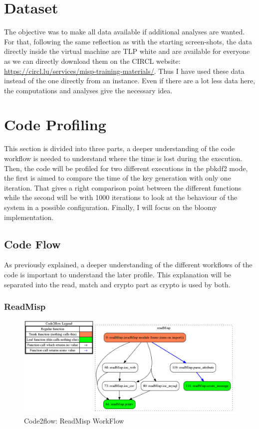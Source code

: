 \documentclass{eplmastersthesis}
\begin{document}
\section{Dataset}
The objective was to make all data available if additional analyses are wanted. For that, following the same reflection as with the starting screen-shots, the data directly inside the virtual machine are TLP white and are available for everyone as we can directly download them on the CIRCL website: \url{https://circl.lu/services/misp-training-materials/}.
Thus I have used these data instead of the one directly from an instance. Even if there are a lot less data here, the computations and analyses give the necessary idea.

\section{Code Profiling}
This section is divided into three parts, a deeper understanding of the code workflow is needed to understand where the time is lost during the execution. Then, the code will be profiled for two different executions in the \gls{pbkdf2} mode, the first is aimed to compare the time of the key generation with only one iteration. That gives a right comparison point between the different functions while the second will be with 1000 iterations to look at the behaviour of the system in a possible configuration. 
Finally, I will focus on the bloomy implementation.

\subsection{Code Flow}
As previously explained, a deeper understanding of the different workflows of the code is important to understand the later profile.
This explanation will be separated into the read, match and crypto part as crypto is used by both.

\subsubsection{ReadMisp}
\begin{figure}[h!]
\begin{center}
	\includegraphics[scale=0.3]{res/flowReadMisp}
	\caption{Code2flow: ReadMisp WorkFlow}
	\label{code2flow-readMisp}
\end{center}
\end{figure}
\end{document}
